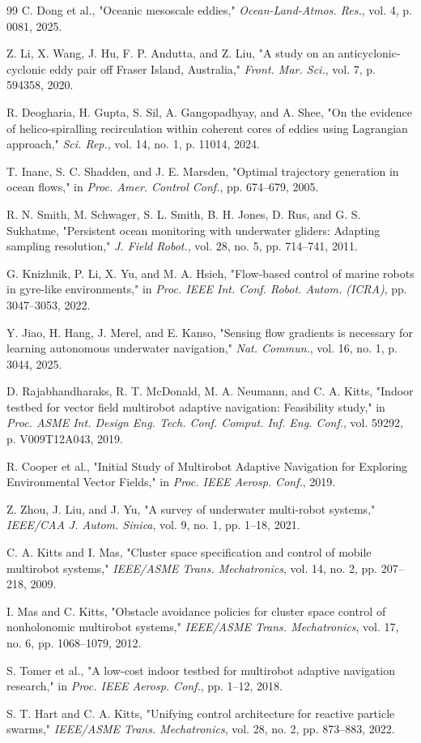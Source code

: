 \documentclass[lettersize,journal]{IEEEtran}
\begin{document}
\begin{thebibliography}{99}
 C. Dong et al., "Oceanic mesoscale eddies," \textit{Ocean-Land-Atmos. Res.}, vol. 4, p. 0081, 2025.

 Z. Li, X. Wang, J. Hu, F. P. Andutta, and Z. Liu, "A study on an anticyclonic-cyclonic eddy pair off Fraser Island, Australia," \textit{Front. Mar. Sci.}, vol. 7, p. 594358, 2020.

 R. Deogharia, H. Gupta, S. Sil, A. Gangopadhyay, and A. Shee, "On the evidence of helico-spiralling recirculation within coherent cores of eddies using Lagrangian approach," \textit{Sci. Rep.}, vol. 14, no. 1, p. 11014, 2024.

 T. Inanc, S. C. Shadden, and J. E. Marsden, "Optimal trajectory generation in ocean flows," in \textit{Proc. Amer. Control Conf.}, pp. 674--679, 2005.

 R. N. Smith, M. Schwager, S. L. Smith, B. H. Jones, D. Rus, and G. S. Sukhatme, "Persistent ocean monitoring with underwater gliders: Adapting sampling resolution," \textit{J. Field Robot.}, vol. 28, no. 5, pp. 714--741, 2011.

 G. Knizhnik, P. Li, X. Yu, and M. A. Hsieh, "Flow-based control of marine robots in gyre-like environments," in \textit{Proc. IEEE Int. Conf. Robot. Autom. (ICRA)}, pp. 3047--3053, 2022.

 Y. Jiao, H. Hang, J. Merel, and E. Kanso, "Sensing flow gradients is necessary for learning autonomous underwater navigation," \textit{Nat. Commun.}, vol. 16, no. 1, p. 3044, 2025.

 D. Rajabhandharaks, R. T. McDonald, M. A. Neumann, and C. A. Kitts, "Indoor testbed for vector field multirobot adaptive navigation: Feasibility study," in \textit{Proc. ASME Int. Design Eng. Tech. Conf. Comput. Inf. Eng. Conf.}, vol. 59292, p. V009T12A043, 2019.

 R. Cooper et al., "Initial Study of Multirobot Adaptive Navigation for Exploring Environmental Vector Fields," in \textit{Proc. IEEE Aerosp. Conf.}, 2019.

 Z. Zhou, J. Liu, and J. Yu, "A survey of underwater multi-robot systems," \textit{IEEE/CAA J. Autom. Sinica}, vol. 9, no. 1, pp. 1--18, 2021.

 C. A. Kitts and I. Mas, "Cluster space specification and control of mobile multirobot systems," \textit{IEEE/ASME Trans. Mechatronics}, vol. 14, no. 2, pp. 207--218, 2009.

 I. Mas and C. Kitts, "Obstacle avoidance policies for cluster space control of nonholonomic multirobot systems," \textit{IEEE/ASME Trans. Mechatronics}, vol. 17, no. 6, pp. 1068--1079, 2012.

 S. Tomer et al., "A low-cost indoor testbed for multirobot adaptive navigation research," in \textit{Proc. IEEE Aerosp. Conf.}, pp. 1--12, 2018.

 S. T. Hart and C. A. Kitts, "Unifying control architecture for reactive particle swarms," \textit{IEEE/ASME Trans. Mechatronics}, vol. 28, no. 2, pp. 873--883, 2022.

\end{thebibliography}
\end{document}

